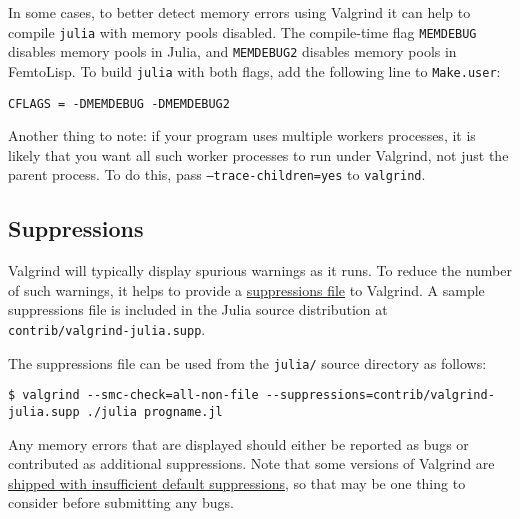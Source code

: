In some cases, to better detect memory errors using Valgrind it can help to compile \texttt{julia} with memory pools disabled.  The compile-time flag \texttt{MEMDEBUG} disables memory pools in Julia, and \texttt{MEMDEBUG2} disables memory pools in FemtoLisp.  To build \texttt{julia} with both flags, add the following line to \texttt{Make.user}:




\begin{verbatim}
CFLAGS = -DMEMDEBUG -DMEMDEBUG2
\end{verbatim}



Another thing to note: if your program uses multiple workers processes, it is likely that you want all such worker processes to run under Valgrind, not just the parent process.  To do this, pass \texttt{--trace-children=yes} to \texttt{valgrind}.



\hypertarget{9183907630008953484}{}


\subsection{Suppressions}



Valgrind will typically display spurious warnings as it runs.  To reduce the number of such warnings, it helps to provide a \href{http://valgrind.org/docs/manual/manual-core.html\#manual-core.suppress}{suppressions file} to Valgrind.  A sample suppressions file is included in the Julia source distribution at \texttt{contrib/valgrind-julia.supp}.



The suppressions file can be used from the \texttt{julia/} source directory as follows:




\begin{lstlisting}
$ valgrind --smc-check=all-non-file --suppressions=contrib/valgrind-julia.supp ./julia progname.jl
\end{lstlisting}



Any memory errors that are displayed should either be reported as bugs or contributed as additional suppressions.  Note that some versions of Valgrind are \href{https://github.com/JuliaLang/julia/issues/8314\#issuecomment-55766210}{shipped with insufficient default suppressions}, so that may be one thing to consider before submitting any bugs.



